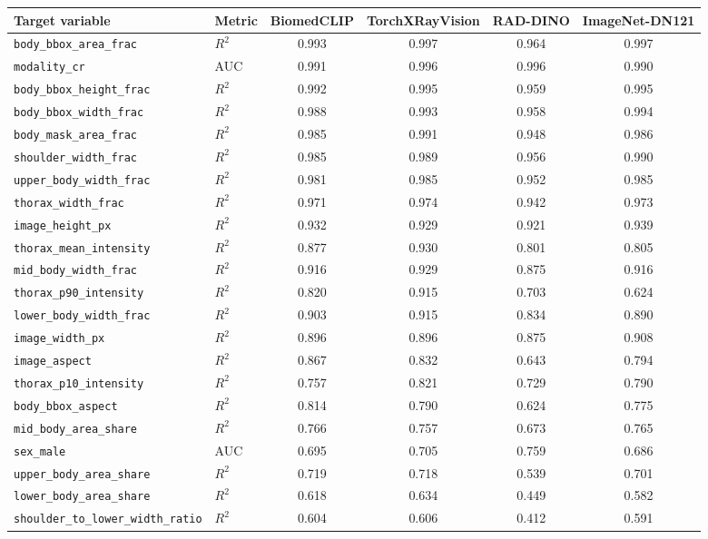 \begin{tabular}{llcccc}
\toprule
Target variable & Metric & BiomedCLIP & TorchXRayVision & RAD-DINO & ImageNet-DN121 \\
\midrule
\texttt{body\_bbox\_area\_frac} & $R^2$ & 0.993 & 0.997 & 0.964 & 0.997 \\
\texttt{modality\_cr} & AUC & 0.991 & 0.996 & 0.996 & 0.990 \\
\texttt{body\_bbox\_height\_frac} & $R^2$ & 0.992 & 0.995 & 0.959 & 0.995 \\
\texttt{body\_bbox\_width\_frac} & $R^2$ & 0.988 & 0.993 & 0.958 & 0.994 \\
\texttt{body\_mask\_area\_frac} & $R^2$ & 0.985 & 0.991 & 0.948 & 0.986 \\
\texttt{shoulder\_width\_frac} & $R^2$ & 0.985 & 0.989 & 0.956 & 0.990 \\
\texttt{upper\_body\_width\_frac} & $R^2$ & 0.981 & 0.985 & 0.952 & 0.985 \\
\texttt{thorax\_width\_frac} & $R^2$ & 0.971 & 0.974 & 0.942 & 0.973 \\
\texttt{image\_height\_px} & $R^2$ & 0.932 & 0.929 & 0.921 & 0.939 \\
\texttt{thorax\_mean\_intensity} & $R^2$ & 0.877 & 0.930 & 0.801 & 0.805 \\
\texttt{mid\_body\_width\_frac} & $R^2$ & 0.916 & 0.929 & 0.875 & 0.916 \\
\texttt{thorax\_p90\_intensity} & $R^2$ & 0.820 & 0.915 & 0.703 & 0.624 \\
\texttt{lower\_body\_width\_frac} & $R^2$ & 0.903 & 0.915 & 0.834 & 0.890 \\
\texttt{image\_width\_px} & $R^2$ & 0.896 & 0.896 & 0.875 & 0.908 \\
\texttt{image\_aspect} & $R^2$ & 0.867 & 0.832 & 0.643 & 0.794 \\
\texttt{thorax\_p10\_intensity} & $R^2$ & 0.757 & 0.821 & 0.729 & 0.790 \\
\texttt{body\_bbox\_aspect} & $R^2$ & 0.814 & 0.790 & 0.624 & 0.775 \\
\texttt{mid\_body\_area\_share} & $R^2$ & 0.766 & 0.757 & 0.673 & 0.765 \\
\texttt{sex\_male} & AUC & 0.695 & 0.705 & 0.759 & 0.686 \\
\texttt{upper\_body\_area\_share} & $R^2$ & 0.719 & 0.718 & 0.539 & 0.701 \\
\texttt{lower\_body\_area\_share} & $R^2$ & 0.618 & 0.634 & 0.449 & 0.582 \\
\texttt{shoulder\_to\_lower\_width\_ratio} & $R^2$ & 0.604 & 0.606 & 0.412 & 0.591 \\

\end{tabular}
